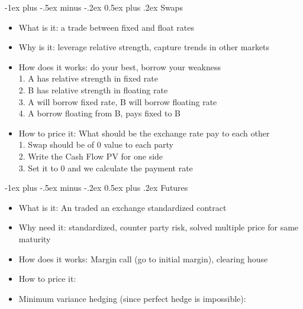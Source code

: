 \documentclass[10pt,landscape]{article}
\makeatletter
\renewcommand{\section}{\@startsection{section}{1}{0mm}%
                                {-1ex plus -.5ex minus -.2ex}%
                                {0.5ex plus .2ex}%
                                {\normalfont\large\bfseries}}
\makeatother
\begin{document}
\begin{multicols}{2}
\setlength{\premulticols}{1pt}
\setlength{\postmulticols}{1pt}
\setlength{\multicolsep}{1pt}
\setlength{\columnsep}{2pt}

\section{Swaps}
\begin{itemize}
	\item What is it: a trade between fixed and float rates
	\item Why is it: leverage relative strength, capture trends in other markets
	\item How does it works: do your best, borrow your weakness
		\\1. A has relative strength in fixed rate
		\\2. B has relative strength in floating rate
		\\3. A will borrow fixed rate, B will borrow floating rate
		\\4. A borrow floating from B, pays fixed to B 
	\item How to price it: What should be the exchange rate pay to each other
		\\1. Swap should be of 0 value to each party
		\\2. Write the Cash Flow PV for one side
		\\3. Set it to 0 and we calculate the payment rate
\end{itemize}

\section{Futures}
\begin{itemize}
	\item What is it: An traded an exchange standardized contract
	\item Why need it: standardized, counter party risk, solved multiple price for same maturity
	\item How does it works: Margin call (go to initial margin), clearing house
	\item How to price it: 
		\\
	\item Minimum variance hedging (since perfect hedge is impossible):
		\\
\end{itemize}


\end{multicols}
\end{document}
